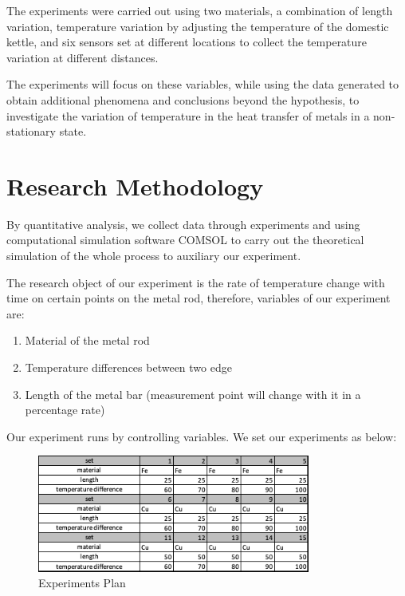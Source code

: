 \documentclass[a4paper,12pt]{article}
\begin{document}
The experiments were carried out using two materials, a combination of length variation, temperature variation by adjusting the temperature of the domestic kettle, and six sensors set at different locations to collect the temperature variation at different distances.


The experiments will focus on these variables, while using the data generated to obtain additional phenomena and conclusions beyond the hypothesis, to investigate the variation of temperature in the heat transfer of metals in a non-stationary state.

\section{Research Methodology}
By quantitative analysis, we collect data through experiments and using computational simulation software COMSOL to carry out the theoretical simulation of the whole process to auxiliary our experiment.

The research object of our experiment is the rate of temperature change with time on certain points on the metal rod, therefore, variables of our experiment are:

\begin{enumerate}
	\item Material of the metal rod
	\item Temperature differences between two edge
	\item Length of the metal bar (measurement point will change with it in a percentage rate)
\end{enumerate}




Our experiment runs by controlling variables. We set our experiments as below:

\begin{figure}[H] %
\centering %
\includegraphics[width=0.8\textwidth]{Plan.png} %
\caption{Experiments Plan} %
\end{figure}
\end{document}
